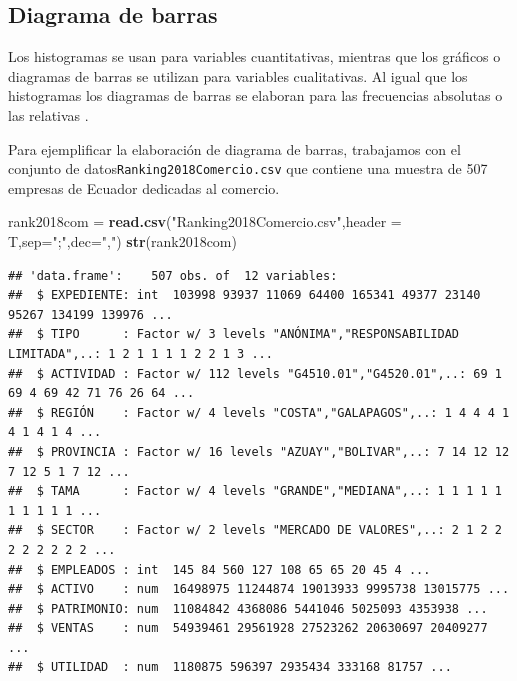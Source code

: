 \documentclass[
]{krantz}
\makeatletter
\newenvironment{Shaded}{\begin{snugshade}}{\end{snugshade}}
\newcommand{\DataTypeTok}[1]{\textcolor[rgb]{0.27,0.27,0.27}{#1}}
\newcommand{\KeywordTok}[1]{\textcolor[rgb]{0.27,0.27,0.27}{\textbf{#1}}}
\newcommand{\NormalTok}[1]{#1}
\newcommand{\StringTok}[1]{\textcolor[rgb]{0.5,0.5,0.5}{#1}}
\newenvironment{kframe}{%
\medskip{}
\setlength{\fboxsep}{.8em}
 \def\at@end@of@kframe{}%
 \ifinner\ifhmode%
  \def\at@end@of@kframe{\end{minipage}}%
  \begin{minipage}{\columnwidth}%
 \fi\fi%
 \def\FrameCommand##1{\hskip\@totalleftmargin \hskip-\fboxsep
 \colorbox{shadecolor}{##1}\hskip-\fboxsep
     \hskip-\linewidth \hskip-\@totalleftmargin \hskip\columnwidth}%
 \MakeFramed {\advance\hsize-\width
   \@totalleftmargin\z@ \linewidth\hsize
   \@setminipage}}%
 {\par\unskip\endMakeFramed%
 \at@end@of@kframe}
\renewenvironment{Shaded}{\begin{kframe}}{\end{kframe}}
\makeatother
\begin{document}
\newpage

\hypertarget{diagrama-de-barras}{%
\subsection{Diagrama de barras}\label{diagrama-de-barras}}

Los histogramas se usan para variables cuantitativas, mientras que los gráficos o diagramas de barras se utilizan para variables cualitativas. Al igual que los histogramas los diagramas de barras se elaboran para las frecuencias absolutas o las relativas \citep{kwm2016}.

Para ejemplificar la elaboración de diagrama de barras, trabajamos con el conjunto de datos\texttt{Ranking2018Comercio.csv} que contiene una muestra de 507 empresas de Ecuador dedicadas al comercio.

\begin{Shaded}
\begin{Highlighting}[]
\NormalTok{rank2018com =}\StringTok{ }\KeywordTok{read.csv}\NormalTok{(}\StringTok{"Ranking2018Comercio.csv"}\NormalTok{,}\DataTypeTok{header =}\NormalTok{ T,}\DataTypeTok{sep=}\StringTok{";"}\NormalTok{,}\DataTypeTok{dec=}\StringTok{","}\NormalTok{)}
\KeywordTok{str}\NormalTok{(rank2018com)}
\end{Highlighting}
\end{Shaded}

\begin{verbatim}
## 'data.frame':    507 obs. of  12 variables:
##  $ EXPEDIENTE: int  103998 93937 11069 64400 165341 49377 23140 95267 134199 139976 ...
##  $ TIPO      : Factor w/ 3 levels "ANÓNIMA","RESPONSABILIDAD LIMITADA",..: 1 2 1 1 1 1 2 2 1 3 ...
##  $ ACTIVIDAD : Factor w/ 112 levels "G4510.01","G4520.01",..: 69 1 69 4 69 42 71 76 26 64 ...
##  $ REGIÓN    : Factor w/ 4 levels "COSTA","GALAPAGOS",..: 1 4 4 4 1 4 1 4 1 4 ...
##  $ PROVINCIA : Factor w/ 16 levels "AZUAY","BOLIVAR",..: 7 14 12 12 7 12 5 1 7 12 ...
##  $ TAMA      : Factor w/ 4 levels "GRANDE","MEDIANA",..: 1 1 1 1 1 1 1 1 1 1 ...
##  $ SECTOR    : Factor w/ 2 levels "MERCADO DE VALORES",..: 2 1 2 2 2 2 2 2 2 2 ...
##  $ EMPLEADOS : int  145 84 560 127 108 65 65 20 45 4 ...
##  $ ACTIVO    : num  16498975 11244874 19013933 9995738 13015775 ...
##  $ PATRIMONIO: num  11084842 4368086 5441046 5025093 4353938 ...
##  $ VENTAS    : num  54939461 29561928 27523262 20630697 20409277 ...
##  $ UTILIDAD  : num  1180875 596397 2935434 333168 81757 ...
\end{verbatim}
\end{document}
